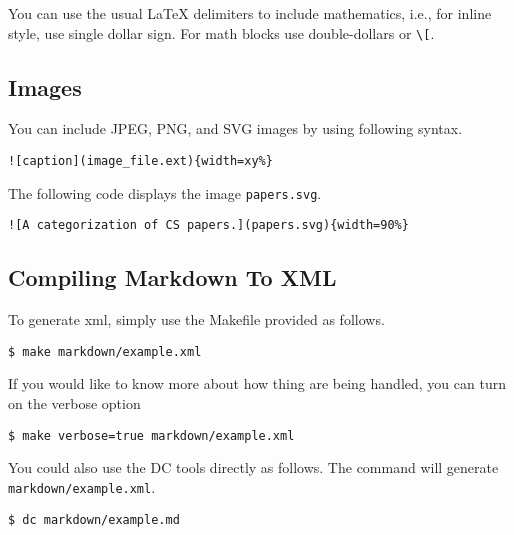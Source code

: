 You can use the usual LaTeX delimiters to include mathematics, i.e., for inline style, use single dollar sign.
%
For math blocks use double-dollars or \lstinline`\[`.

\subsection{Images}

\begin{flex}
\begin{gram}
You can include JPEG, PNG, and SVG images by using following syntax.
\begin{lstlisting}
![caption](image_file.ext){width=xy%}
\end{lstlisting}
\end{gram}

\begin{example}
The following code displays the image \lstinline`papers.svg`.
\begin{lstlisting}
![A categorization of CS papers.](papers.svg){width=90%}
\end{lstlisting}
\end{example}
\end{flex}

\subsection{Compiling Markdown To XML}

\begin{gram}
To generate xml, simply use the Makefile provided as follows.
%
\begin{lstlisting}
$ make markdown/example.xml
\end{lstlisting}
%
If you would like to know more about how thing are being handled, you can turn on the verbose option
%
\begin{lstlisting}
$ make verbose=true markdown/example.xml 
\end{lstlisting}
\end{gram}

\begin{gram}
You could also use the DC tools directly as follows.
%
The command will generate  \lstinline`markdown/example.xml`.

\begin{lstlisting}
$ dc markdown/example.md
\end{lstlisting}

\end{gram}

